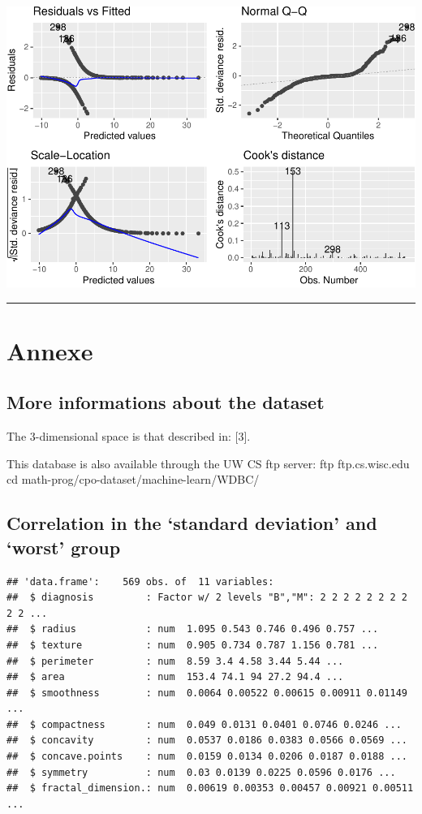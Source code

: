 \documentclass[
  11pt,
]{article}
\begin{document}
\includegraphics{stat_DAP_files/figure-latex/unnamed-chunk-19-1.pdf}

\begin{center}\rule{0.5\linewidth}{0.5pt}\end{center}

\hypertarget{annexe}{%
\section{Annexe}\label{annexe}}

\hypertarget{more-informations-about-the-dataset}{%
\subsection{More informations about the
dataset}\label{more-informations-about-the-dataset}}

The 3-dimensional space is that described in: {[}3{]}.

This database is also available through the UW CS ftp server: ftp
ftp.cs.wisc.edu cd math-prog/cpo-dataset/machine-learn/WDBC/

\hypertarget{correlation-in-the-standard-deviation-and-worst-group}{%
\subsection{Correlation in the `standard deviation' and `worst'
group}\label{correlation-in-the-standard-deviation-and-worst-group}}

\begin{verbatim}
## 'data.frame':    569 obs. of  11 variables:
##  $ diagnosis         : Factor w/ 2 levels "B","M": 2 2 2 2 2 2 2 2 2 2 ...
##  $ radius            : num  1.095 0.543 0.746 0.496 0.757 ...
##  $ texture           : num  0.905 0.734 0.787 1.156 0.781 ...
##  $ perimeter         : num  8.59 3.4 4.58 3.44 5.44 ...
##  $ area              : num  153.4 74.1 94 27.2 94.4 ...
##  $ smoothness        : num  0.0064 0.00522 0.00615 0.00911 0.01149 ...
##  $ compactness       : num  0.049 0.0131 0.0401 0.0746 0.0246 ...
##  $ concavity         : num  0.0537 0.0186 0.0383 0.0566 0.0569 ...
##  $ concave.points    : num  0.0159 0.0134 0.0206 0.0187 0.0188 ...
##  $ symmetry          : num  0.03 0.0139 0.0225 0.0596 0.0176 ...
##  $ fractal_dimension.: num  0.00619 0.00353 0.00457 0.00921 0.00511 ...
\end{verbatim}
\end{document}
